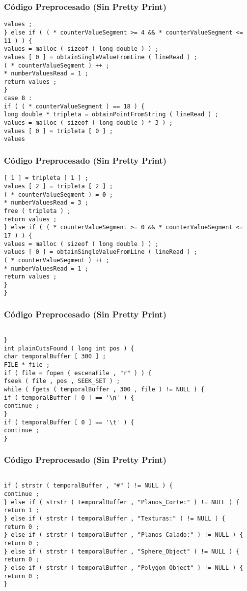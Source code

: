 \documentclass{beamer}
\begin{document}
\begin{frame}[fragile]
\frametitle{C\'odigo Preprocesado (Sin Pretty Print)}
\begin{lstlisting}[style=CStyle]
values ; 
} else if ( ( * counterValueSegment >= 4 && * counterValueSegment <= 11 ) ) { 
values = malloc ( sizeof ( long double ) ) ; 
values [ 0 ] = obtainSingleValueFromLine ( lineRead ) ; 
( * counterValueSegment ) ++ ; 
* numberValuesRead = 1 ; 
return values ; 
} 
case 8 : 
if ( ( * counterValueSegment ) == 18 ) { 
long double * tripleta = obtainPointFromString ( lineRead ) ; 
values = malloc ( sizeof ( long double ) * 3 ) ; 
values [ 0 ] = tripleta [ 0 ] ; 
values \end{lstlisting}
\end{frame}
\begin{frame}[fragile]
\frametitle{C\'odigo Preprocesado (Sin Pretty Print)}
\begin{lstlisting}[style=CStyle]
[ 1 ] = tripleta [ 1 ] ; 
values [ 2 ] = tripleta [ 2 ] ; 
( * counterValueSegment ) = 0 ; 
* numberValuesRead = 3 ; 
free ( tripleta ) ; 
return values ; 
} else if ( ( * counterValueSegment >= 0 && * counterValueSegment <= 17 ) ) { 
values = malloc ( sizeof ( long double ) ) ; 
values [ 0 ] = obtainSingleValueFromLine ( lineRead ) ; 
( * counterValueSegment ) ++ ; 
* numberValuesRead = 1 ; 
return values ; 
} 
} \end{lstlisting}
\end{frame}
\begin{frame}[fragile]
\frametitle{C\'odigo Preprocesado (Sin Pretty Print)}
\begin{lstlisting}[style=CStyle]

} 
int plainCutsFound ( long int pos ) { 
char temporalBuffer [ 300 ] ; 
FILE * file ; 
if ( file = fopen ( escenaFile , "r" ) ) { 
fseek ( file , pos , SEEK_SET ) ; 
while ( fgets ( temporalBuffer , 300 , file ) != NULL ) { 
if ( temporalBuffer [ 0 ] == '\n' ) { 
continue ; 
} 
if ( temporalBuffer [ 0 ] == '\t' ) { 
continue ; 
} \end{lstlisting}
\end{frame}
\begin{frame}[fragile]
\frametitle{C\'odigo Preprocesado (Sin Pretty Print)}
\begin{lstlisting}[style=CStyle]

if ( strstr ( temporalBuffer , "#" ) != NULL ) { 
continue ; 
} else if ( strstr ( temporalBuffer , "Planos_Corte:" ) != NULL ) { 
return 1 ; 
} else if ( strstr ( temporalBuffer , "Texturas:" ) != NULL ) { 
return 0 ; 
} else if ( strstr ( temporalBuffer , "Planos_Calado:" ) != NULL ) { 
return 0 ; 
} else if ( strstr ( temporalBuffer , "Sphere_Object" ) != NULL ) { 
return 0 ; 
} else if ( strstr ( temporalBuffer , "Polygon_Object" ) != NULL ) { 
return 0 ; 
} \end{lstlisting}
\end{frame}
\end{document}
